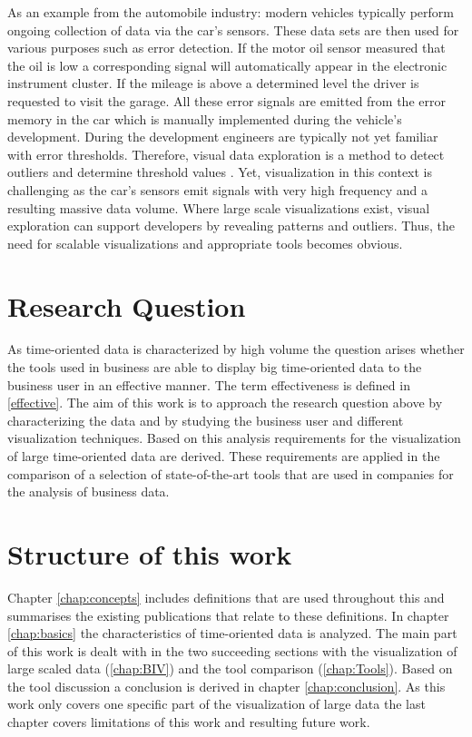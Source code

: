 \par 
As an example from the automobile industry: modern  vehicles typically perform ongoing collection of data via the car's sensors. These data sets are then used for various purposes such as error detection. If the motor oil sensor measured that the oil is low a corresponding signal will automatically appear in the electronic instrument cluster. If the mileage is above a determined level the driver is requested to visit the garage. All these error signals are emitted from the error memory in the car which is manually implemented during the vehicle's development. During the development engineers are typically not yet familiar with error thresholds. Therefore, visual data exploration is a method to detect outliers and determine threshold values . Yet, visualization in this context is challenging as the car's sensors emit signals with very high frequency and a resulting massive data volume. Where large scale visualizations exist, visual exploration can support developers by revealing patterns and outliers. Thus,  the need for scalable visualizations and appropriate tools becomes obvious. 


\section{Research Question}
As time-oriented data is characterized by high volume the question arises whether the tools used in business are able to display big time-oriented data to the business user in an effective manner. The term effectiveness is defined in \ref{effective}. The aim of this work is to approach the research question above by characterizing the data and by studying the business user and different visualization techniques. Based on this analysis requirements for the visualization of large time-oriented data are derived. These requirements are applied in the comparison of a selection of state-of-the-art tools that are used in companies for the analysis of business data.


\section{Structure of this work}
Chapter \ref{chap:concepts} includes definitions that are used throughout this and  summarises the existing publications that relate to these definitions. In chapter \ref{chap:basics} the characteristics of time-oriented data is analyzed. The main part of this work is dealt with in the two succeeding sections with the visualization of large scaled data (\ref{chap:BIV}) and the tool comparison (\ref{chap:Tools}). 
Based on the tool discussion a conclusion is derived in chapter \ref{chap:conclusion}.
As this work only covers one specific part of the visualization of large data the last chapter covers limitations of this work and resulting future work.


